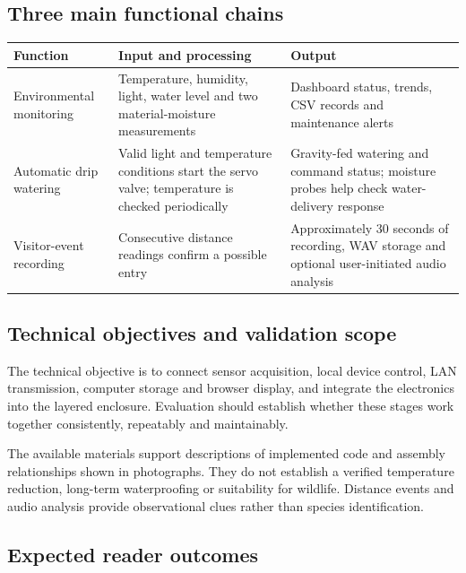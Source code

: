 \documentclass[10pt,a4paper]{article}
\begin{document}
\subsection{Three main functional chains}

\begin{longtable}{>{\raggedright\arraybackslash}p{42mm}>{\raggedright\arraybackslash}p{59mm}>{\raggedright\arraybackslash}p{58mm}}
\toprule
\textbf{Function} & \textbf{Input and processing} & \textbf{Output}\\\midrule\endhead
Environmental monitoring & Temperature, humidity, light, water level and two material-moisture measurements & Dashboard status, trends, CSV records and maintenance alerts\\
Automatic drip watering & Valid light and temperature conditions start the servo valve; temperature is checked periodically & Gravity-fed watering and command status; moisture probes help check water-delivery response\\
Visitor-event recording & Consecutive distance readings confirm a possible entry & Approximately 30 seconds of recording, WAV storage and optional user-initiated audio analysis\\
\bottomrule\end{longtable}

\subsection{Technical objectives and validation scope}

The technical objective is to connect sensor acquisition, local device control, LAN transmission, computer storage and browser display, and integrate the electronics into the layered enclosure. Evaluation should establish whether these stages work together consistently, repeatably and maintainably.


The available materials support descriptions of implemented code and assembly relationships shown in photographs. They do not establish a verified temperature reduction, long-term waterproofing or suitability for wildlife. Distance events and audio analysis provide observational clues rather than species identification.


\subsection{Expected reader outcomes}
\end{document}
